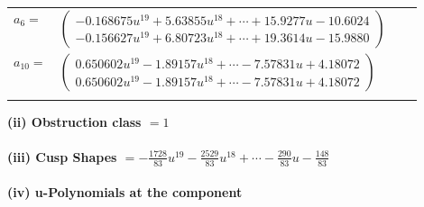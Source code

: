\documentclass[1p]{elsarticle_modified}
\theoremstyle{definition}
\begin{document}
\begin{tabular}{m{7pt} m{180pt} m{7pt} m{180pt} }
\flushright $a_{6}=$&$\begin{pmatrix}-0.168675 u^{19}+5.63855 u^{18}+\cdots+15.9277 u-10.6024\\-0.156627 u^{19}+6.80723 u^{18}+\cdots+19.3614 u-15.9880\end{pmatrix}$ \\
\flushright $a_{10}=$&$\begin{pmatrix}0.650602 u^{19}-1.89157 u^{18}+\cdots-7.57831 u+4.18072\\0.650602 u^{19}-1.89157 u^{18}+\cdots-7.57831 u+4.18072\end{pmatrix}$\\&\end{tabular}
\flushleft \textbf{(ii) Obstruction class $= 1$}\\~\\
\flushleft \textbf{(iii) Cusp Shapes $= -\frac{1728}{83} u^{19}-\frac{2529}{83} u^{18}+\cdots-\frac{290}{83} u-\frac{148}{83}$}\\~\\
\newpage\renewcommand{\arraystretch}{1}
\flushleft \textbf{(iv) u-Polynomials at the component}\newline \\
\end{document}
